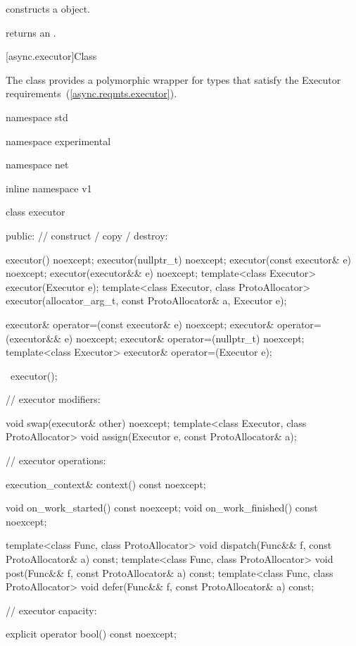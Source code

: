 \begin{itemdescr}
\pnum
\effects constructs a  object.

\pnum
\postconditions
{} returns an  \ntbs.
\end{itemdescr}



[async.executor]{Class }

\pnum
The  class provides a polymorphic wrapper for types that satisfy the Executor requirements~(\ref{async.reqmts.executor}).

\begin{codeblock}
namespace std {
namespace experimental {
namespace net {
inline namespace v1 {

  class executor
  {
  public:
    // construct / copy / destroy:

    executor() noexcept;
    executor(nullptr_t) noexcept;
    executor(const executor& e) noexcept;
    executor(executor&& e) noexcept;
    template<class Executor> executor(Executor e);
    template<class Executor, class ProtoAllocator>
      executor(allocator_arg_t, const ProtoAllocator& a, Executor e);

    executor& operator=(const executor& e) noexcept;
    executor& operator=(executor&& e) noexcept;
    executor& operator=(nullptr_t) noexcept;
    template<class Executor> executor& operator=(Executor e);

    ~executor();

    // executor modifiers:

    void swap(executor& other) noexcept;
    template<class Executor, class ProtoAllocator>
      void assign(Executor e, const ProtoAllocator& a);

    // executor operations:

    execution_context& context() const noexcept;

    void on_work_started() const noexcept;
    void on_work_finished() const noexcept;

    template<class Func, class ProtoAllocator>
      void dispatch(Func&& f, const ProtoAllocator& a) const;
    template<class Func, class ProtoAllocator>
      void post(Func&& f, const ProtoAllocator& a) const;
    template<class Func, class ProtoAllocator>
      void defer(Func&& f, const ProtoAllocator& a) const;

    // executor capacity:

    explicit operator bool() const noexcept;

}}}}}
\end{codeblock}
